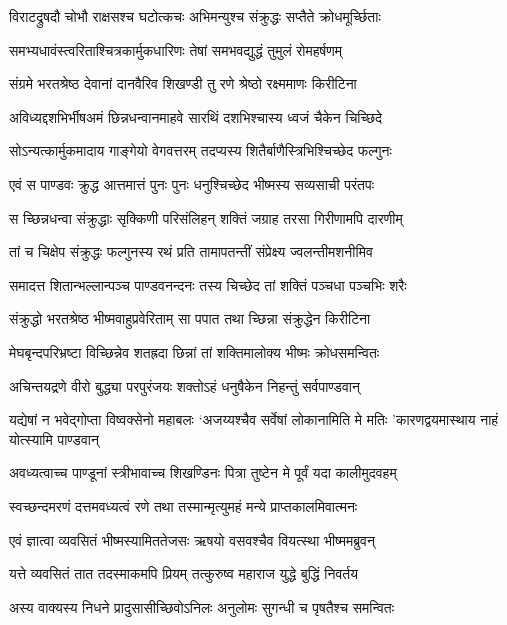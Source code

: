 \twolineshloka
{विराटद्रुषदौ चोभौ राक्षसश्च घटोत्कचः}
{अभिमन्युश्च संक्रुद्धः सप्तैते क्रोधमूर्च्छिताः}


\twolineshloka
{समभ्यधावंस्त्वरिताश्चित्रकार्मुकधारिणः}
{तेषां समभवद्युद्धं तुमुलं रोमहर्षणम्}


\twolineshloka
{संग्रमे भरतश्रेष्ठ देवानां दानवैरिव}
{शिखण्डी तु रणे श्रेष्ठो रक्ष्ममाणः किरीटिना}


\twolineshloka
{अविध्यद्दशभिर्भीषअमं छिन्नधन्वानमाहवे}
{सारथिं दशभिश्चास्य ध्वजं चैकेन चिच्छिदे}


\twolineshloka
{सोऽन्यत्कार्मुकमादाय गाङ्गेयो वेगवत्तरम्}
{तदप्यस्य शितैर्बाणैस्त्रिभिश्चिच्छेद फल्गुनः}


\twolineshloka
{एवं स पाण्डवः क्रुद्ध आत्तमात्तं पुनः पुनः}
{धनुश्चिच्छेद भीष्मस्य सव्यसाची परंतपः}


\twolineshloka
{स च्छिन्नधन्वा संक्रुद्धाः सृक्किणी परिसंलिहन्}
{शक्तिं जग्राह तरसा गिरीणामपि दारणीम्}


\twolineshloka
{तां च चिक्षेप संक्रुद्धः फल्गुनस्य रथं प्रति}
{तामापतन्तीं संप्रेक्ष्य ज्वलन्तीमशनीमिव}


\twolineshloka
{समादत्त शितान्भल्लान्पञ्च पाण्डवनन्दनः}
{तस्य चिच्छेद तां शक्तिं पञ्चधा पञ्चभिः शरैः}


\twolineshloka
{संक्रुद्धो भरतश्रेष्ठ भीष्मवाहुप्रवेरिताम्}
{सा पपात तथा च्छिन्ना संक्रुद्धेन किरीटिना}


\threelineshloka
{मेघबृन्दपरिभ्रष्टा विच्छिन्नेव शतह्रदा}
{छिन्नां तां शक्तिमालोक्य भीष्मः क्रोधसमन्वितः}
{}


\twolineshloka
{अचिन्तयद्रणे वीरो बुद्ध्या परपुरंजयः}
{शक्तोऽहं धनुषैकेन निहन्तुं सर्वपाण्डवान्}


\threelineshloka
{यद्येषां न भवेद्गोप्ता विष्वक्सेनो महाबलः}
{`अजय्यश्चैव सर्वेषां लोकानामिति मे मतिः}
{'कारणद्वयमास्थाय नाहं योत्स्यामि पाण्डवान्}


\twolineshloka
{अवध्यत्वाच्च पाण्डूनां स्त्रीभावाच्च शिखण्डिनः}
{पित्रा तुष्टेन मे पूर्वं यदा कालीमुदवहम्}


\twolineshloka
{स्वच्छन्दमरणं दत्तमवध्यत्वं रणे तथा}
{तस्मान्मृत्युमहं मन्ये प्राप्तकालमिवात्मनः}


\twolineshloka
{एवं ज्ञात्वा व्यवसितं भीष्मस्यामिततेजसः}
{ऋषयो वसवश्चैव वियत्स्था भीष्ममब्रुवन्}


\twolineshloka
{यत्ते व्यवसितं तात तदस्माकमपि प्रियम्}
{तत्कुरुष्व महाराज युद्धे बुद्धिं निवर्तय}


\twolineshloka
{अस्य वाक्यस्य निधने प्रादुसासीच्छिवोऽनिलः}
{अनुलोमः सुगन्धी च पृषतैश्च समन्वितः}


